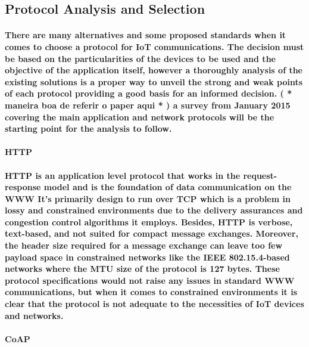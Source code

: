 \subsection{Protocol Analysis and Selection}

\paragraph{
	There are many alternatives and some proposed standards when it comes to choose a protocol for \ac{IoT} communications. The decision must be based on the particularities of the devices to be used and the objective of the application itself, however a thoroughly analysis of the existing solutions is a proper way to unveil the strong and weak points of each protocol providing a good basis for an informed decision. ( * maneira boa de referir o paper aqui * ) a survey from January 2015 \cite{Al-Fuqaha2015} covering the main application and network protocols will be the starting point for the analysis to follow.
}

\paragraph{\textbf{\ac{HTTP}}}
\paragraph{
	\ac{HTTP} is an application level protocol that works in the request-response model and is the foundation of data communication on the \ac{WWW} It's primarily design to run over \ac{TCP} which is a problem in lossy and constrained environments due to the delivery assurances and congestion control algorithms it employs. Besides, {HTTP} is verbose, text-based, and not suited for compact message exchanges. Moreover, the header size required for a message exchange can leave too few payload space in constrained networks like the IEEE 802.15.4-based networks where the \ac{MTU} size of the protocol is 127 bytes. These protocol specifications would not raise any issues in standard \ac{WWW} communications, but when it comes to constrained environments it is clear that the protocol is not adequate to the necessities of \ac{IoT} devices and networks.
}

\paragraph{\textbf{\ac{CoAP}}}
